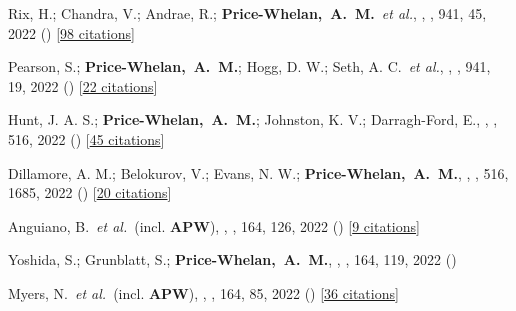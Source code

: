 {\item[{\color{deemph}\scriptsize111}]Rix, H.; Chandra, V.; Andrae, R.; \textbf{Price-Whelan,~A.~M.}~\textit{et al.}, , \apj, 941, 45, 2022 () [\href{http://adsabs.harvard.edu/abs/2022ApJ...941...45R}{98 citations}]

\item[{\color{deemph}\scriptsize110}]Pearson, S.; \textbf{Price-Whelan,~A.~M.}; Hogg, D. W.; Seth, A. C.~\textit{et al.}, , \apj, 941, 19, 2022 () [\href{http://adsabs.harvard.edu/abs/2022ApJ...941...19P}{22 citations}]

\item[{\color{deemph}\scriptsize109}]Hunt, J. A. S.; \textbf{Price-Whelan,~A.~M.}; Johnston, K. V.; Darragh-Ford, E., , \mnras, 516, 2022 () [\href{http://adsabs.harvard.edu/abs/2022MNRAS.516L...7H}{45 citations}]

\item[{\color{deemph}\scriptsize108}]Dillamore, A. M.; Belokurov, V.; Evans, N. W.; \textbf{Price-Whelan,~A.~M.}, , \mnras, 516, 1685, 2022 () [\href{http://adsabs.harvard.edu/abs/2022MNRAS.516.1685D}{20 citations}]

\item[{\color{deemph}\scriptsize107}]Anguiano, B.~\textit{et al.}~(incl. \textbf{APW}), , \aj, 164, 126, 2022 () [\href{http://adsabs.harvard.edu/abs/2022AJ....164..126A}{9 citations}]

\item[{\color{deemph}\scriptsize106}]Yoshida, S.; Grunblatt, S.; \textbf{Price-Whelan,~A.~M.}, , \aj, 164, 119, 2022 ()

\item[{\color{deemph}\scriptsize105}]Myers, N.~\textit{et al.}~(incl. \textbf{APW}), , \aj, 164, 85, 2022 () [\href{http://adsabs.harvard.edu/abs/2022AJ....164...85M}{36 citations}]

}
